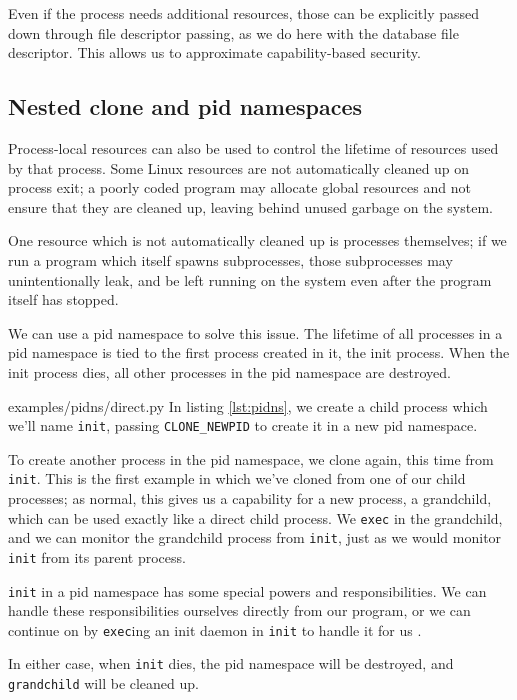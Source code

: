 \documentclass[letterpaper,twocolumn,10pt]{article}
\begin{document}
Even if the process needs additional resources,
those can be explicitly passed down through file descriptor passing,
as we do here with the database file descriptor.
This allows us to approximate capability-based security\cite{capsicum}.
\subsection{Nested clone and pid namespaces}\label{pidns}
Process-local resources can also be used to control the lifetime of resources used by that process.
Some Linux resources are not automatically cleaned up on process exit;
a poorly coded program may allocate global resources
and not ensure that they are cleaned up,
leaving behind unused garbage on the system.

One resource which is not automatically cleaned up is processes themselves;
if we run a program which itself spawns subprocesses,
those subprocesses may unintentionally leak,
and be left running on the system even after the program itself has stopped\cite{caternfork}.

We can use a pid namespace to solve this issue.
The lifetime of all processes in a pid namespace is tied to the first process created in it,
the init process.
When the init process dies,
all other processes in the pid namespace are destroyed\cite{pid_namespaces}.


{examples/pidns/direct.py}
In listing \ref{lst:pidns},
we create a child process which we'll name \texttt{init},
passing \verb|CLONE_NEWPID| to create it in a new pid namespace\cite{clone}.

To create another process in the pid namespace,
we clone again, this time from \texttt{init}.
This is the first example in which we've cloned from one of our child processes;
as normal, this gives us a capability for a new process, a grandchild,
which can be used exactly like a direct child process.
We \texttt{exec} in the grandchild,
and we can monitor the grandchild process from \texttt{init},
just as we would monitor \texttt{init} from its parent process.

\texttt{init} in a pid namespace has some special powers and responsibilities.
We can handle these responsibilities ourselves directly from our program,
or we can continue on by \texttt{exec}ing an init daemon in \texttt{init} to handle it for us
\cite{pid_namespaces}\cite{tini}\cite{dumb_init}.

In either case, when \texttt{init} dies,
the pid namespace will be destroyed,
and \texttt{grandchild} will be cleaned up.
\end{document}
